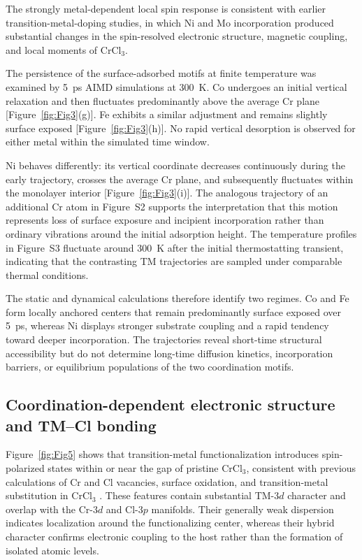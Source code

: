 \documentclass[journal=jacsat,manuscript=article]{achemso}
\begin{document}
The strongly metal-dependent local spin response is consistent with earlier transition-metal-doping studies, in which Ni and Mo incorporation produced substantial changes in the spin-resolved electronic structure, magnetic coupling, and local moments of CrCl$_3$\cite{Wang2019,Safi2023}.

The persistence of the surface-adsorbed motifs at finite temperature was examined by 5~ps AIMD simulations at 300~K. Co undergoes an initial vertical relaxation and then fluctuates predominantly above the average Cr plane [Figure~\ref{fig:Fig3}(g)]. Fe exhibits a similar adjustment and remains slightly surface exposed [Figure~\ref{fig:Fig3}(h)]. No rapid vertical desorption is observed for either metal within the simulated time window.

Ni behaves differently: its vertical coordinate decreases continuously during the early trajectory, crosses the average Cr plane, and subsequently fluctuates within the monolayer interior [Figure~\ref{fig:Fig3}(i)]. The analogous trajectory of an additional Cr atom in Figure~S2 supports the interpretation that this motion represents loss of surface exposure and incipient incorporation rather than ordinary vibrations around the initial adsorption height. The temperature profiles in Figure~S3 fluctuate around 300~K after the initial thermostatting transient, indicating that the contrasting TM trajectories are sampled under comparable thermal conditions.

The static and dynamical calculations therefore identify two regimes. Co and Fe form locally anchored centers that remain predominantly surface exposed over 5~ps, whereas Ni displays stronger substrate coupling and a rapid tendency toward deeper incorporation. The trajectories reveal short-time structural accessibility but do not determine long-time diffusion kinetics, incorporation barriers, or equilibrium populations of the two coordination motifs.


\subsection{Coordination-dependent electronic structure and TM--Cl bonding}

\noindent Figure~\ref{fig:Fig5} shows that transition-metal functionalization introduces spin-polarized states within or near the gap of pristine CrCl$_3$, consistent with previous calculations of Cr and Cl vacancies, surface oxidation, and transition-metal substitution in CrCl$_3$ \cite{Gao2018,Mastrippolito2021,Wang2019,Safi2023}. These features contain substantial TM-$3d$ character and overlap with the Cr-$3d$ and Cl-$3p$ manifolds. Their generally weak dispersion indicates localization around the functionalizing center, whereas their hybrid character confirms electronic coupling to the host rather than the formation of isolated atomic levels.
\end{document}
